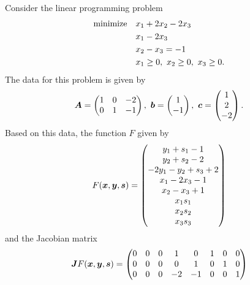  \begin{example}
  Consider the linear programming problem
  \begin{align*}
   \text{minimize}\quad & x_1+2x_2-2x_3\\
   & x_1-2x_3\\
   & x_2-x_3=-1\\
   & x_1\geq 0, \ x_2\geq 0, \ x_3\geq 0.
  \end{align*}
The data for this problem is given by
\begin{equation*}
 \mtx{A} = \begin{pmatrix} 1 & 0 & -2\\ 0 & 1 & -1\end{pmatrix}, \ 
 \vct{b} = \begin{pmatrix} 1 \\ -1 \end{pmatrix}, \ 
 \vct{c} = \begin{pmatrix} 1 \\ 2 \\ -2 \end{pmatrix}.
\end{equation*}
Based on this data, the function $F$ given by
\begin{equation*}
 F(\bm{x},\bm{y},\bm{s}) = \begin{pmatrix}
                               y_1+s_1-1\\
                               y_2+s_2-2\\
                               -2y_1-y_2+s_3+2\\
                               x_1-2x_3-1\\
                               x_2-x_3+1\\
                               x_1s_1\\
                               x_2s_2\\
                               x_3s_3
                              \end{pmatrix}
\end{equation*}
and the Jacobian matrix
\begin{equation*}
 \bm{J}F(\bm{x},\bm{y},\bm{s}) = \begin{pmatrix}
                                0 & 0 & 0 & 1 & 0 & 1 & 0 & 0\\
                                0 & 0 & 0 & 0 & 1 & 0 & 1 & 0\\
                                0 & 0 & 0 & -2 & -1 & 0 & 0 & 1\\

\end{pmatrix}
\end{equation*}
\end{example}
